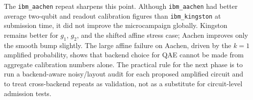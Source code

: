 The \texttt{ibm\_aachen} repeat sharpens this point. Although
\texttt{ibm\_aachen} had better average two-qubit and readout calibration
figures than \texttt{ibm\_kingston} at submission time, it did not improve the
microcampaign globally. Kingston remains better for \(g_1\), \(g_2\), and the
shifted affine stress case; Aachen improves only the smooth bump slightly. The
large affine failure on Aachen, driven by the \(k=1\) amplified probability,
shows that backend choice for QAE cannot be made from aggregate calibration
numbers alone. The practical rule for the next phase is to run a backend-aware
noisy/layout audit for each proposed amplified circuit and to treat
cross-backend repeats as validation, not as a substitute for circuit-level
admission tests.
